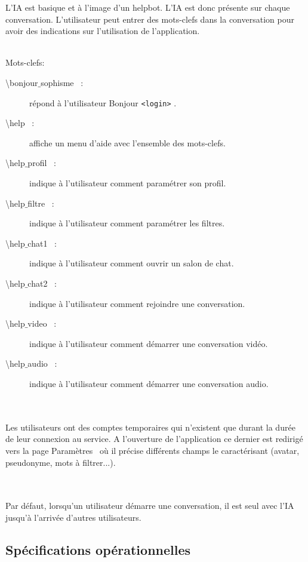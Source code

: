 \documentclass[11pt,dvipsnames,svgnames]{report}
\begin{document}
\begin{mdframed}[topline=false,rightline=false,bottomline=false, linewidth=3pt,linecolor=red]
L'IA est basique et à l'image d'un helpbot. L'IA est donc présente sur chaque conversation. L'utilisateur peut entrer des mots-clefs dans la conversation pour avoir des indications sur l'utilisation de l'application.

~\\
Mots-clefs:
\begin{description}
\item[\og \textbackslash bonjour$\_$sophisme \fg\ :] répond à l'utilisateur \og Bonjour \texttt{<login>} \fg.
\item[\og \textbackslash help \fg\ :] affiche un menu d'aide avec l'ensemble des mots-clefs.
\item[\og \textbackslash help$\_$profil \fg\ :] indique à l'utilisateur comment paramétrer son profil.
\item[\og \textbackslash help$\_$filtre \fg\ :] indique à l'utilisateur comment paramétrer les filtres.
\item[\og \textbackslash help$\_$chat1 \fg\ :] indique à l'utilisateur comment ouvrir un salon de chat.
\item[\og \textbackslash help$\_$chat2 \fg\ :] indique à l'utilisateur comment rejoindre une conversation.
\item[\og \textbackslash help$\_$video \fg\ :] indique à l'utilisateur comment démarrer une conversation vidéo.
\item[\og \textbackslash help$\_$audio \fg\ :] indique à l'utilisateur comment démarrer une conversation audio.
\end{description}

~\\\\

Les utilisateurs ont des comptes temporaires qui n'existent que durant la durée de leur connexion au service. A l'ouverture de l'application ce dernier est redirigé vers la page \og Paramètres \fg\ où il précise différents champs le caractérisant (avatar, pseudonyme, mots à filtrer...).

~\\\\
Par défaut, lorsqu'un utilisateur démarre une conversation, il est seul avec l'IA jusqu'à l'arrivée d'autres utilisateurs.
\end{mdframed}

\subsection{Spécifications opérationnelles}
\end{document}

